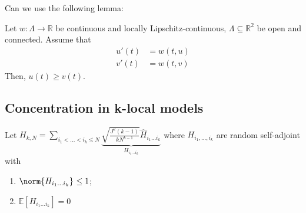 Can we use the following lemma:

\begin{lem}[]
    Let \( w: \Lambda \to \mathbb{R} \) be continuous and locally Lipschitz-continuous, \( \Lambda \subseteq \mathbb{R}^{2} \) be open and connected. Assume that 
    \begin{align*}
      u'(t) &= w(t,u) \\
      v'(t) &= w(t,v)
    \end{align*}
Then, \( u(t) \geq v(t) \).   
\end{lem}


\subsection{Concentration in k-local models}

\begin{defn}
  Let \( H_{k,N} = \sum_{i_1<\dots < i_k \leq N}^{} \underbrace{\sqrt{\frac{J^{2}(k-1)}{kN^{k-1}}}\widehat{H}_{i_1 \dots i_k}}_{H_{i_1\dots i_k}} \) 
  where \( H_{i_1,\dots,i_k} \) are random self-adjoint with 
  \begin{enumerate}[1)]
    \item \(\norm{H_{i_1 \dots i_k}}_{} \leq 1\);
    \item \( \mathbb{E}\left[H_{i_1 \dots i_k}\right] =0\)
  \end{enumerate}
\end{defn}


